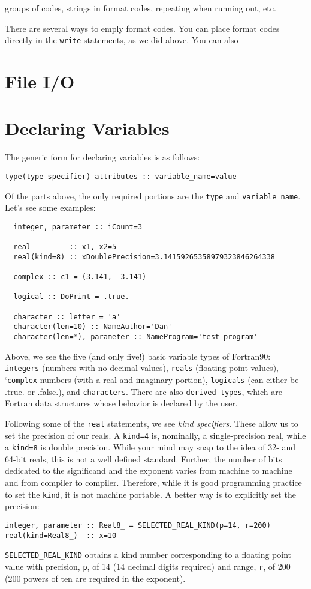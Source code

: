 \documentclass[11pt, letterpaper]{article}
\begin{document}
groups of codes, strings in format codes, repeating when running out, etc.

There are several ways to emply format codes.
You can place format codes directly in the {\tt write} statements, as we did above.
You can also 

\section{File I/O}

\section{Declaring Variables}

The generic form for declaring variables is as follows:
\begin{verbatim}
type(type specifier) attributes :: variable_name=value
\end{verbatim}
Of the parts above, the only required portions are the \texttt{type} and
\texttt{variable\_name}.  Let's see some examples:

\begin{verbatim}
  integer, parameter :: iCount=3

  real         :: x1, x2=5
  real(kind=8) :: xDoublePrecision=3.14159265358979323846264338
  
  complex :: c1 = (3.141, -3.141)

  logical :: DoPrint = .true.

  character :: letter = 'a'
  character(len=10) :: NameAuthor='Dan' 
  character(len=*), parameter :: NameProgram='test program'
\end{verbatim}

Above, we see the five (and only five!) basic variable types of Fortran90:
\texttt{integers} (numbers with no decimal values), \texttt{reals} (floating-point
values), `\texttt{complex} numbers (with a real and imaginary portion),
\texttt{logicals} (can either be .true. or .false.), and \texttt{characters}.  There
are also \texttt{derived types}, which are Fortran data structures whose
behavior is declared by the user.

Following some of the \texttt{real} statements, we see \emph{kind specifiers}.
These allow us to set the precision of our reals.  A \texttt{kind=4} is,
nominally, a single-precision real, while a \texttt{kind=8} is double precision.
While your mind may snap to the idea of 32- and 64-bit reals, this is not
a well defined standard.  Further, the number of bits dedicated to the
significand and the exponent varies from machine to machine and from
compiler to compiler.  Therefore, while it is good programming practice to
set the \texttt{kind}, it is not machine portable.  A better way is to explicitly
set the precision:
\begin{verbatim}
integer, parameter :: Real8_ = SELECTED_REAL_KIND(p=14, r=200)
real(kind=Real8_)  :: x=10
\end{verbatim}
\texttt{SELECTED\_REAL\_KIND} obtains a kind number corresponding to a floating
point value with precision, \texttt{p}, of 14 (14 decimal digits required) and
range, \texttt{r}, of 200 (200 powers of ten are required in the exponent).
\end{document}
